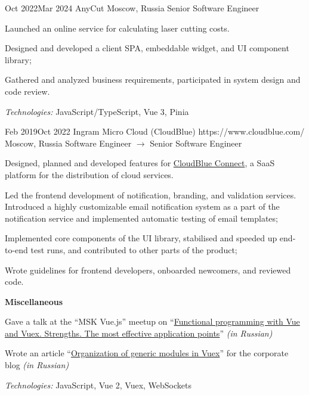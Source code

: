 \documentclass[10pt]{article}
\begin{document}
\job
	{Oct 2022}{Mar 2024}
	{AnyCut}
	{}
	{Moscow, Russia}
	{Senior Software Engineer}
	{
	  Launched an online service for calculating laser cutting costs.

	  \begin{supercompactitemize}
		\item Designed and developed a client SPA, embeddable widget, and UI component library;
		\item Gathered and analyzed business requirements, participated in system design and code review.
	  \end{supercompactitemize}

	  \textit{Technologies:} JavaScript/TypeScript, Vue 3, Pinia
	}

\job
	{Feb 2019}{Oct 2022}
	{Ingram Micro Cloud (CloudBlue)}
	{https://www.cloudblue.com/}
	{Moscow, Russia}
	{Software Engineer $\rightarrow$ Senior Software Engineer}
	{
	  Designed, planned and developed features for \href{https://connect.cloudblue.com/community/}{CloudBlue Connect}, a SaaS platform for the distribution of cloud services.

	  \begin{supercompactitemize}
		  \item Led the frontend development of notification, branding, and validation services. \\ Introduced a highly customizable email notification system as a part of the notification service and implemented automatic testing of email templates;
		  \item Implemented core components of the UI library, stabilised and speeded up end-to-end test runs, and contributed to other parts of the product;
		  \item Wrote guidelines for frontend developers, onboarded newcomers, and reviewed code.
	  \end{supercompactitemize}

	  \textbf{Miscellaneous}

	  \begin{supercompactitemize}
		\item Gave a talk at the ``MSK Vue.js'' meetup on ``\href{https://www.youtube.com/watch?v=Rz_RynHNZKg}{Functional programming with Vue and Vuex. Strengths. The most effective application points}'' \textit{(in Russian)}
		\item Wrote an article ``\href{https://habr.com/ru/company/odin_ingram_micro/blog/526094/}{Organization of generic modules in Vuex}'' for the corporate blog \textit{(in Russian)}
	  \end{supercompactitemize}

	  \textit{Technologies:} JavaScript, Vue 2, Vuex, WebSockets
	}
\end{document}
